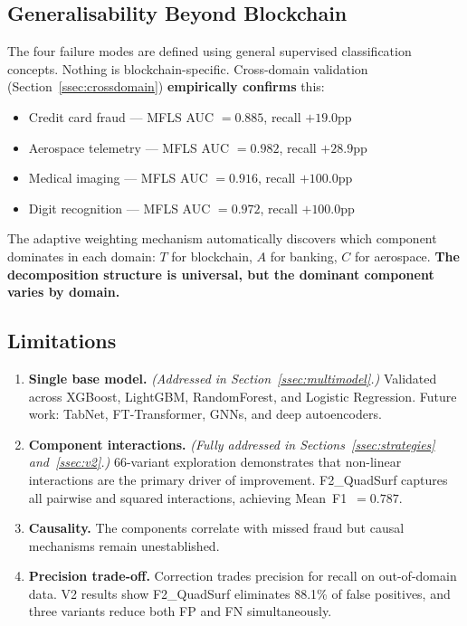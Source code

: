 \documentclass[journal]{IEEEtran}
\begin{document}
\subsection{Generalisability Beyond Blockchain}

The four failure modes are defined using general supervised classification concepts. Nothing is blockchain-specific. Cross-domain validation (Section~\ref{ssec:crossdomain}) \textbf{empirically confirms} this:

\begin{itemize}
  \item Credit card fraud --- MFLS AUC $= 0.885$, recall $+19.0$pp
  \item Aerospace telemetry --- MFLS AUC $= 0.982$, recall $+28.9$pp
  \item Medical imaging --- MFLS AUC $= 0.916$, recall $+100.0$pp
  \item Digit recognition --- MFLS AUC $= 0.972$, recall $+100.0$pp
\end{itemize}

The adaptive weighting mechanism automatically discovers which component dominates in each domain: $T$ for blockchain, $A$ for banking, $C$ for aerospace. \textbf{The decomposition structure is universal, but the dominant component varies by domain.}

\subsection{Limitations}

\begin{enumerate}
  \item \textbf{Single base model.} \textit{(Addressed in Section~\ref{ssec:multimodel}.)} Validated across XGBoost, LightGBM, RandomForest, and Logistic Regression. Future work: TabNet, FT-Transformer, GNNs, and deep autoencoders.

  \item \textbf{Component interactions.} \textit{(Fully addressed in Sections~\ref{ssec:strategies} and~\ref{ssec:v2}.)} 66-variant exploration demonstrates that non-linear interactions are the primary driver of improvement. F2\_QuadSurf captures all pairwise and squared interactions, achieving Mean~F1~$=0.787$.

  \item \textbf{Causality.} The components correlate with missed fraud but causal mechanisms remain unestablished.

  \item \textbf{Precision trade-off.} Correction trades precision for recall on out-of-domain data. V2 results show F2\_QuadSurf eliminates 88.1\% of false positives, and three variants reduce both FP and FN simultaneously.
\end{enumerate}
\end{document}
